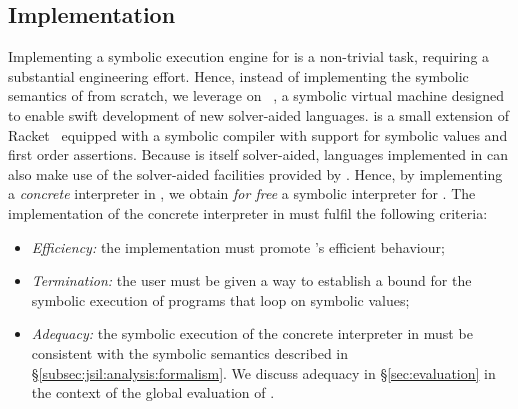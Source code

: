 \subsection{Implementation}
\label{subsec:jsil:analysis:implementation}

Implementing a symbolic execution engine for \jsil is a non-trivial 
task, requiring a substantial engineering effort. 
% 
% 
Hence, instead of implementing the symbolic semantics of \jsil from scratch, we leverage on 
\rosette~\cite{Rosette1,Rosette2}, a symbolic virtual machine designed to 
enable swift development of new 
solver-aided languages. 
%
\rosette is a small extension of Racket~\cite{racket} equipped with a symbolic compiler with support 
for symbolic values and first order assertions. Because \rosette is itself solver-aided, languages 
implemented in \rosette can also make use of the solver-aided facilities provided by \rosette. 
Hence, by implementing a \emph{concrete} \jsil interpreter in \rosette, we obtain \emph{for free} a symbolic 
interpreter for \jsil. %
%
The implementation of the concrete interpreter in \rosette must fulfil the following criteria:

\begin{itemize}          
   \item \emph{Efficiency:} the implementation must promote \rosette's efficient behaviour;
   
   \item \emph{Termination:} the user must be given a way to establish a bound for the symbolic execution 
            of programs that loop on symbolic values; 
  
   \item \emph{Adequacy:} the symbolic execution of the concrete interpreter in \rosette 
            must be consistent with the symbolic semantics described in \S\ref{subsec:jsil:analysis:formalism}. 
            We discuss adequacy in \S\ref{sec:evaluation} in the context of the global evaluation 
            of \jilette.
\end{itemize}


